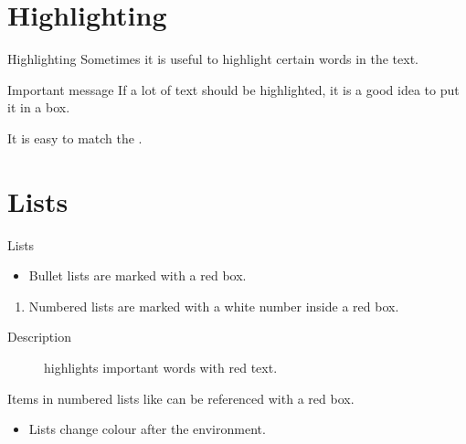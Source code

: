 \documentclass[UKenglish,aspectratio=169,logotop]{beamer}
\begin{document}
\section{Highlighting}
\SectionFrame


\begin{frame}{Highlighting}
    Sometimes it is useful to \alert{highlight} certain words in the text.

    \begin{alertblock}{Important message}
        If a lot of text should be \alert{highlighted}, it is a good idea to put it in a box.
    \end{alertblock}

    It is easy to match the .
\end{frame}


\section{Lists}


\begin{frame}{Lists}
    \begin{itemize}
        \item
        Bullet lists are marked with a red box.
    \end{itemize}

    \begin{enumerate}
        \item
        \label{enum:item}
        Numbered lists are marked with a white number inside a red box.
    \end{enumerate}

    \begin{description}
        \item[Description] highlights important words with red text.
    \end{description}

    Items in numbered lists like  can be referenced with a red box.

    \begin{example}
        \begin{itemize}
            \item
            Lists change colour after the environment.
        \end{itemize}
    \end{example}
    \vspace{2ex}
\end{frame}
\end{document}
